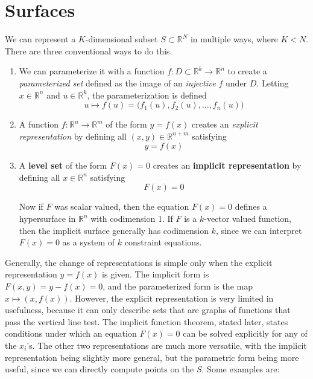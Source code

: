 \section{Surfaces}

  We can represent a $K$-dimensional subset $S \subset \mathbb{R}^N$ in multiple ways, where $K < N$. There are three conventional ways to do this. 
  \begin{enumerate}
		\item We can parameterize it with a function $f: D \subset \mathbb{R}^k \longrightarrow \mathbb{R}^n$ to create a \textit{parameterized set} defined as the image of an \textit{injective} $f$ under $D$. Letting $x \in \mathbb{R}^n$ and $u \in \mathbb{R}^k$, the parameterization is defined 
			\begin{equation}
				u \mapsto f(u) = \big( f_1 (u), f_2 (u), \ldots, f_n (u) \big)
			\end{equation}
		
		\item A function $f: \mathbb{R}^n \longrightarrow \mathbb{R}^m$ of the form $y = f(x)$ creates an \textit{explicit representation} by defining all $(x, y) \in \mathbb{R}^{n+m}$ satisfying 
			\begin{equation}
				y = f(x)
			\end{equation}
		
		\item A \textbf{level set} of the form $F(x) = 0$ creates an \textbf{implicit representation} by defining all $x \in \mathbb{R}^n$ satisfying 
			\begin{equation}
				F(x) = 0
			\end{equation}

		Now if $F$ was scalar valued, then the equation $F(x) = 0$ defines a hypersurface in $\mathbb{R}^n$ with codimension 1. If $F$ is a $k$-vector valued function, then the implicit surface generally has codimension $k$, since we can interpret $F(x) = 0$ as a system of $k$ constraint equations. 
  \end{enumerate}

  Generally, the change of representations is simple only when the explicit representation $y = f(x)$ is given. The implicit form is $F(x, y) = y - f(x) = 0$, and the parameterized form is the map $x \mapsto (x, f(x))$. However, the explicit representation is very limited in usefulness, because it can only describe sets that are graphs of functions that pass the vertical line test. The implicit function theorem, stated later, states conditions under which an equation $F(x) = 0$ can be solved explicitly for any of the $x_i$'s. The other two representations are much more versatile, with the implicit representation being slightly more general, but the parametric form being more useful, since we can directly compute points on the $S$. Some examples are: 

